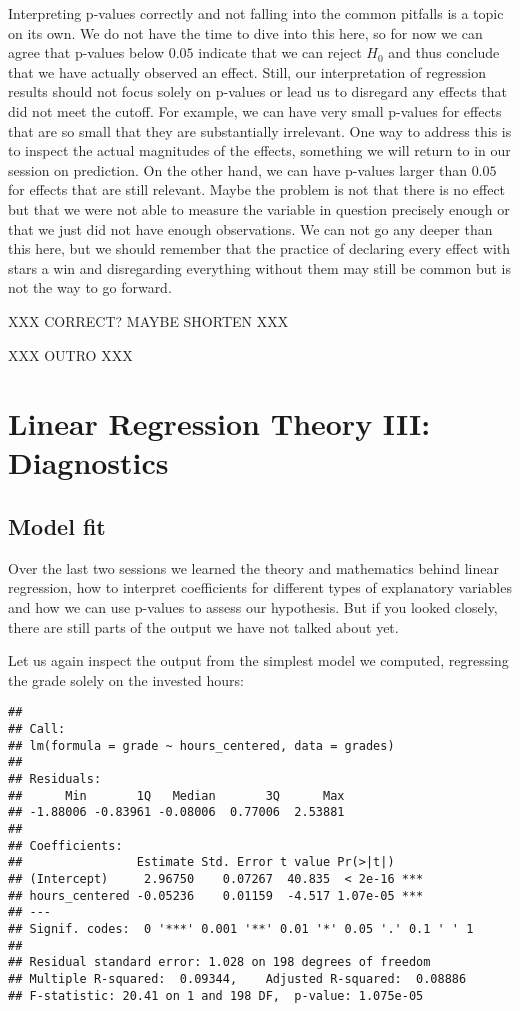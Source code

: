 \documentclass[
]{book}
\begin{document}
Interpreting p-values correctly and not falling into the common pitfalls is a
topic on its own. We do not have the time to dive into this here, so for now we
can agree that p-values below \(0.05\) indicate that we can reject \(H_0\) and thus
conclude that we have actually observed an effect. Still, our interpretation of
regression results should not focus solely on p-values or lead us to disregard
any effects that did not meet the cutoff. For example, we can have very small
p-values for effects that are so small that they are substantially irrelevant.
One way to address this is to inspect the actual magnitudes of the effects,
something we will return to in our session on prediction. On the other hand, we
can have p-values larger than \(0.05\) for effects that are still relevant. Maybe
the problem is not that there is no effect but that we were not able to measure
the variable in question precisely enough or that we just did not have enough
observations. We can not go any deeper than this here, but we should remember
that the practice of declaring every effect with stars a win and disregarding
everything without them may still be common but is not the way to go forward.

XXX CORRECT? MAYBE SHORTEN XXX

XXX OUTRO XXX

\hypertarget{log-t-3}{%
\chapter{Linear Regression Theory III: Diagnostics}\label{log-t-3}}

\hypertarget{model-fit}{%
\section{Model fit}\label{model-fit}}

Over the last two sessions we learned the theory and mathematics behind linear
regression, how to interpret coefficients for different types of explanatory
variables and how we can use p-values to assess our hypothesis. But if you
looked closely, there are still parts of the output we have not talked about
yet.

Let us again inspect the output from the simplest model we computed, regressing
the grade solely on the invested hours:

\begin{verbatim}
## 
## Call:
## lm(formula = grade ~ hours_centered, data = grades)
## 
## Residuals:
##      Min       1Q   Median       3Q      Max 
## -1.88006 -0.83961 -0.08006  0.77006  2.53881 
## 
## Coefficients:
##                Estimate Std. Error t value Pr(>|t|)    
## (Intercept)     2.96750    0.07267  40.835  < 2e-16 ***
## hours_centered -0.05236    0.01159  -4.517 1.07e-05 ***
## ---
## Signif. codes:  0 '***' 0.001 '**' 0.01 '*' 0.05 '.' 0.1 ' ' 1
## 
## Residual standard error: 1.028 on 198 degrees of freedom
## Multiple R-squared:  0.09344,    Adjusted R-squared:  0.08886 
## F-statistic: 20.41 on 1 and 198 DF,  p-value: 1.075e-05
\end{verbatim}
\end{document}
